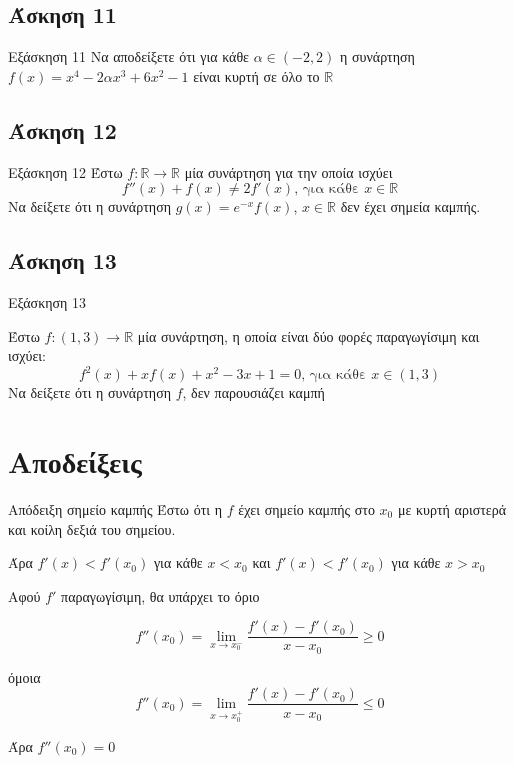 \documentclass[greek]{beamer}
\begin{document}
\subsection{Άσκηση 11}
\begin{frame}[label=Άσκηση11,,t]{Εξάσκηση 11}
  Να αποδείξετε ότι για κάθε $α\in (-2,2)$ η συνάρτηση $f(x)=x^4-2αx^3+6x^2-1$ είναι κυρτή σε όλο το $\mathbb{R}$

\end{frame}

\subsection{Άσκηση 12}
\begin{frame}[label=Άσκηση12,t]{Εξάσκηση 12}
  Έστω $f:\mathbb{R}\to\mathbb{R}$ μία συνάρτηση για την οποία ισχύει
  $$f''(x)+f(x)\ne 2f'(x)\text{, για κάθε } x\in\mathbb{R}$$
  Να δείξετε ότι η συνάρτηση $g(x)=e^{-x}f(x)$, $x\in\mathbb{R}$ δεν έχει σημεία καμπής.

\end{frame}

\subsection{Άσκηση 13}
\begin{frame}[label=Άσκηση13,t]{Εξάσκηση 13}

  Έστω $f:(1,3)\to\mathbb{R}$ μία συνάρτηση, η οποία είναι δύο φορές παραγωγίσιμη και ισχύει:
  $$f^2(x)+xf(x)+x^2-3x+1=0\text{, για κάθε } x\in (1,3)$$
  Να δείξετε ότι η συνάρτηση $f$, δεν παρουσιάζει καμπή

\end{frame}


\appendix

\section{Αποδείξεις}
\begin{frame}[label=Απόδειξη1]{Απόδειξη σημείο καμπής}
   Έστω ότι η $f$ έχει σημείο καμπής στο $x_0$ με κυρτή αριστερά και κοίλη δεξιά του σημείου.

  Άρα $f'(x)< f'(x_0)$ για κάθε $x<x_0$ και $f'(x)<f'(x_0)$ για κάθε $x>x_0$

   Αφού $f'$ παραγωγίσιμη, θα υπάρχει το όριο

  $$f''(x_0)=\lim\limits_{x \to x_0^-}{ \dfrac{f'(x)-f'(x_0)}{x-x_0} }\ge 0$$

   όμοια
  $$f''(x_0)=\lim\limits_{x \to x_0^+}{ \dfrac{f'(x)-f'(x_0)}{x-x_0} } \le 0$$

   Άρα $f''(x_0)=0$ \hyperlink{Θεώρημα1}{}
\end{frame}
\end{document}
